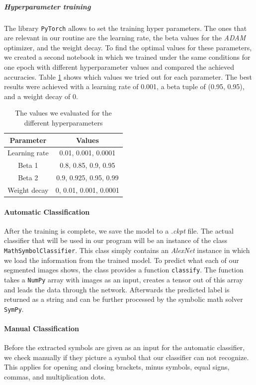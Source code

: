 \documentclass[12pt]{article}
\begin{document}
	\subparagraph{Hyperparameter training}
	The library \texttt{PyTorch} allows to set the training hyper parameters. The ones that are relevant in our routine are the learning rate, the beta values for the \textit{ADAM} optimizer, and the weight decay. To find the optimal values for these parameters, we created a second notebook in which we trained under the same conditions for one epoch with different hyperparameter values and compared the achieved accuracies. Table \ref{tab:hyperparams} shows which values we tried out for each parameter. The best results were achieved with a learning rate of 0.001, a beta tuple of (0.95, 0.95), and a weight decay of 0.
	\begin{table}[h!]
		\begin{tabular}{c|c}
			\textbf{Parameter} & \textbf{Values} \\
			\hline
			Learning rate & 0.01, 0.001, 0.0001 \\
			Beta 1 & 0.8, 0.85, 0.9, 0.95 \\
			Beta 2 & 0.9, 0.925, 0.95, 0.99 \\
			Weight decay & 0, 0.01, 0.001, 0.0001
		\end{tabular}
		\caption{The values we evaluated for the different hyperparameters}
		\label{tab:hyperparams}
	\end{table}
	
	\paragraph{Automatic Classification}
	After the training is complete, we save the model to a \textit{.ckpt} file. The actual classifier that will be used in our program will be an instance of the class \texttt{MathSymbolClassifier}. This class simply contains an \textit{AlexNet} instance in which we load the information from the trained model. To predict what each of our segmented images shows, the class provides a function \texttt{classify}. The function takes a \texttt{NumPy} array with images as an input, creates a tensor out of this array and leads the data through the network. Afterwards the predicted label is returned as a string and can be further processed by the symbolic math solver \texttt{SymPy}.
	
	\paragraph{Manual Classification}
	Before the extracted symbols are given as an input for the automatic classifier, we check manually if they picture a symbol that our classifier can not recognize. This applies for opening and closing brackets, minus symbols, equal signs, commas, and multiplication dots.
	
\end{document}
